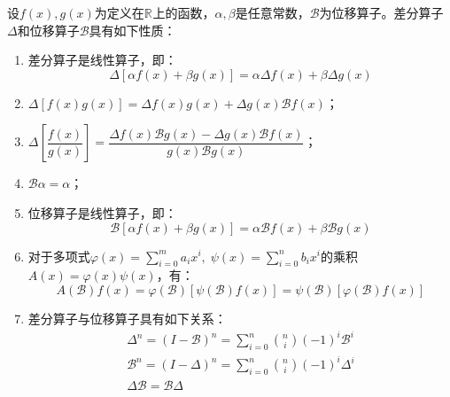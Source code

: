 \begin{property}
	设$f(x),g(x)$为定义在$\mathbb{R}^{}$上的函数，$\alpha,\beta$是任意常数，$\mathcal{B}$为位移算子。差分算子$\Delta$和位移算子$\mathcal{B}$具有如下性质：
	\begin{enumerate}
		\item 差分算子是线性算子，即：
		\begin{equation*}
			\Delta[\alpha f(x)+\beta g(x)]=\alpha\Delta f(x)+\beta\Delta g(x)
		\end{equation*}
		\item $\Delta[f(x)g(x)]=\Delta f(x)g(x)+\Delta g(x)\mathcal{B}f(x)$；
		\item $\Delta\left[\dfrac{f(x)}{g(x)}\right]=\dfrac{\Delta f(x)\mathcal{B}g(x)-\Delta g(x)\mathcal{B}f(x)}{g(x)\mathcal{B}g(x)}$；
		\item $\mathcal{B}\alpha=\alpha$；
		\item 位移算子是线性算子，即：
		\begin{equation*}
			\mathcal{B}[\alpha f(x)+\beta g(x)]=\alpha\mathcal{B}f(x)+\beta\mathcal{B}g(x)
		\end{equation*}
		\item 对于多项式$\varphi(x)=\sum\limits_{i=0}^{m}a_ix^i,\;\psi(x)=\sum\limits_{i=0}^{n}b_ix^i$的乘积$A(x)=\varphi(x)\psi(x)$，有：
		\begin{equation*}
			A(\mathcal{B})f(x)=\varphi(\mathcal{B})[\psi(\mathcal{B})f(x)]=\psi(\mathcal{B})[\varphi(\mathcal{B})f(x)]
		\end{equation*}
		\item 差分算子与位移算子具有如下关系：
		\begin{gather*}
			\Delta^n=(I-\mathcal{B})^n=\sum_{i=0}^{n}\binom{n}{i}(-1)^i\mathcal{B}^i \\
			\mathcal{B}^n=(I-\Delta)^n=\sum_{i=0}^{n}\binom{n}{i}(-1)^i\Delta^i \\
			\Delta\mathcal{B}=\mathcal{B}\Delta
		\end{gather*}
	\end{enumerate}
\end{property}
